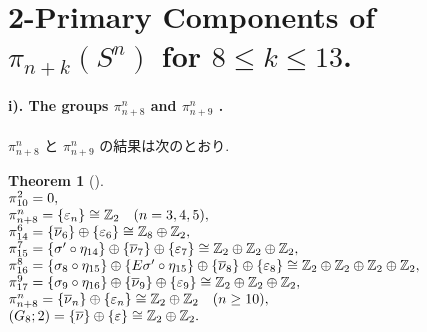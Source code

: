 \documentclass[10pt, leqno]{ltjsarticle}
\author{}
\date{}
\makeatletter
\newcommand{\ov}[1]{\overline{#1}}
\newenvironment{Thleft}[1][]{%
  \begin{theorem}[#1]\mbox{}\\[0ex]\begingroup
  \setlength{\arraycolsep}{0pt}%
  \renewcommand{\arraystretch}{1.0}%
  \noindent$\begin{array}{@{}l@{}}%
}{%
  \end{array}$\par\endgroup\end{theorem}%
}
\newcommand{\gen}[1]{\{#1\}}       %
\newcommand{\pit}[2]{\pi_{#1}^{#2}}
\numberwithin{equation}{section}
\theoremstyle{plain}
\newtheorem{theorem}{Theorem}[section]
\theoremstyle{definition}
\theoremstyle{remark}
\makeatother
\begin{document}
\setcounter{section}{6}
\section{2-Primary Components of $\pi_{n+k}(S^{n})$ for $8\le k\le13$.}

\begin{paracol}{2}


\paragraph{i). The groups $\pit{n+8}{n}$ and $\pit{n+9}{n}$ .}
\noindent
$\pit{n+8}{n}$ と $\pit{n+9}{n}$ の結果は次のとおり. 

\begin{Thleft}[]
\pit{10}{2}=0,\\
\pit{n+8}{n}=\gen{\varepsilon_{n}}\cong\mathbb Z_{2}\quad (n=3,4,5),\\
\pit{14}{6}=\gen{\ov\nu_{6}}\oplus\gen{\varepsilon_{6}}\cong\mathbb Z_{8}\oplus\mathbb Z_{2},\\
\pit{15}{7}=\gen{\sigma'\circ\eta_{14}}\oplus\gen{\ov{\nu}_{7}}\oplus\gen{\varepsilon_{7}}\cong \mathbb Z_{2}\oplus\mathbb Z_{2}\oplus\mathbb Z_{2},\\
\pit{16}{8}=\gen{\sigma_{8}\circ\eta_{15}}\oplus\gen{E\sigma'\circ\eta_{15}}\oplus\gen{\ov{\nu}_{8}}\oplus\gen{\varepsilon_{8}}\cong \mathbb Z_{2}\oplus\mathbb Z_{2}\oplus\mathbb Z_{2}\oplus\mathbb Z_{2},\ \ \ \ \ \ \ \ \ \ \ \ \ \ \ \ \\
\pit{17}{9}=\gen{\sigma_{9}\circ\eta_{16}}\oplus\gen{\ov{\nu}_{9}}\oplus\gen{\varepsilon_{9}}\cong \mathbb Z_{2}\oplus\mathbb Z_{2}\oplus\mathbb Z_{2},\\
\pit{n+8}{n}=\gen{\ov{\nu}_{n}}\oplus\gen{\varepsilon_{n}}\cong \mathbb Z_{2}\oplus\mathbb Z_{2}\quad (n\ge10),\\
(G_{8};2)=\gen{\ov{\nu}}\oplus\gen{\varepsilon}\cong\mathbb Z_{2}\oplus\mathbb Z_{2}.
\end{Thleft}


\end{paracol}
\end{document}
